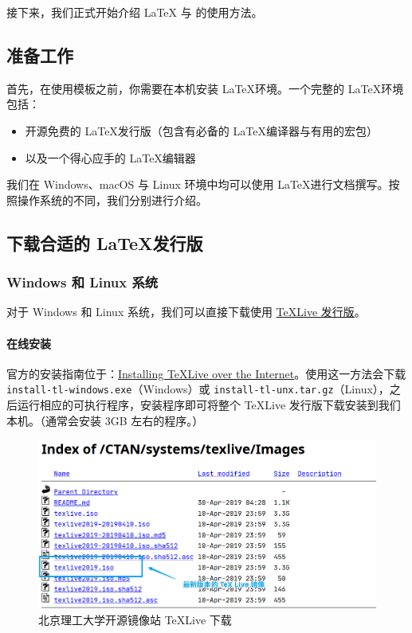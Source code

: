 接下来，我们正式开始介绍 {\LaTeX} 与 {\BIThesis} 的使用方法。

\subsection{准备工作}
首先，在使用模板之前，你需要在本机安装 \LaTeX 环境。一个完整的 \LaTeX 环境包括：

\begin{itemize}
  \item 开源免费的 \LaTeX 发行版（包含有必备的 \LaTeX 编译器与有用的宏包）
  \item 以及一个得心应手的 \LaTeX 编辑器
\end{itemize}

我们在 Windows、macOS 与 Linux 环境中均可以使用 \LaTeX 进行文档撰写。按照操作系统的不同，我们分别进行介绍。

\subsection{下载合适的 \LaTeX 发行版}

\subsubsection{Windows 和 Linux 系统}
对于 Windows 和 Linux 系统，我们可以直接下载使用 \href{https://www.tug.org/texlive/}{\TeX Live 发行版}。

\paragraph{在线安装} 官方的安装指南位于：\href{https://www.tug.org/texlive/acquire-netinstall.html}{Installing \TeX Live over the Internet}。使用这一方法会下载 \texttt{install-tl-windows.exe}（Windows）或 \texttt{install-tl-unx.tar.gz}（Linux），之后运行相应的可执行程序，安装程序即可将整个 \TeX Live 发行版下载安装到我们本机。（通常会安装 3GB 左右的程序。）

\begin{figure}[H]
  \centering
  \includegraphics[width=\textwidth]{images/bit_mirror_texlive.png}
  \caption{北京理工大学开源镜像站 \TeX Live 下载}
  \label{mirrorbit}
\end{figure}

